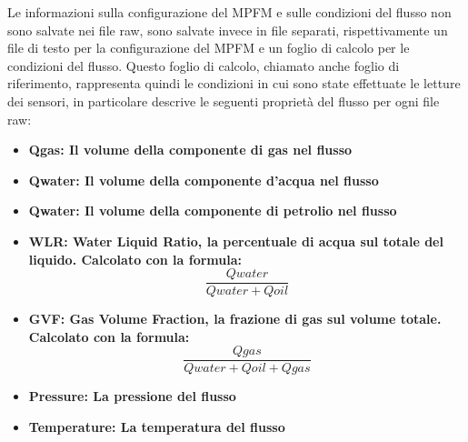 Le informazioni sulla configurazione del MPFM e sulle condizioni del flusso non sono salvate nei file raw, sono salvate invece in file separati, rispettivamente un file di testo per la configurazione del MPFM e un foglio di calcolo per le condizioni del flusso. Questo foglio di calcolo, chiamato anche foglio di riferimento, rappresenta quindi le condizioni in cui sono state effettuate le letture dei sensori, in particolare descrive le seguenti proprietà del flusso per ogni file raw:

\begin{itemize}
	\item \bfseries{Qgas}: Il volume della componente di gas nel flusso
	\item \bfseries{Qwater}: Il volume della componente d'acqua nel flusso
	\item \bfseries{Qwater}: Il volume della componente di petrolio nel flusso
	\item \bfseries{WLR}: Water Liquid Ratio, la percentuale di acqua sul totale del liquido. Calcolato con la formula: \[\frac{Qwater}{Qwater+Qoil}\]
	\item \bfseries{GVF}: Gas Volume Fraction, la frazione di gas sul volume totale. Calcolato con la formula: \[\frac{Qgas}{Qwater+Qoil+Qgas}\]
	\item \bfseries{Pressure}: La pressione del flusso
	\item \bfseries{Temperature}: La temperatura del flusso
\end{itemize}




